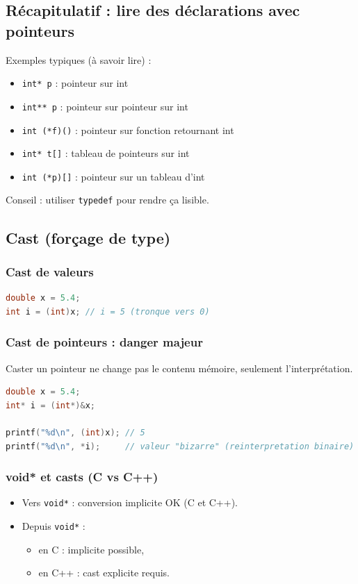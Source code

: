 \subsection{Récapitulatif : lire des déclarations avec pointeurs}
Exemples typiques (à savoir lire) :
\begin{itemize}
  \item \texttt{int* p} : pointeur sur int
  \item \texttt{int** p} : pointeur sur pointeur sur int
  \item \texttt{int (*f)()} : pointeur sur fonction retournant int
  \item \texttt{int* t[]} : tableau de pointeurs sur int
  \item \texttt{int (*p)[]} : pointeur sur un tableau d'int
\end{itemize}
Conseil : utiliser \texttt{typedef} pour rendre ça lisible.

\subsection{Cast (forçage de type)}
\subsubsection{Cast de valeurs}
\begin{lstlisting}[language=C]
double x = 5.4;
int i = (int)x; // i = 5 (tronque vers 0)
\end{lstlisting}

\subsubsection{Cast de pointeurs : danger majeur}
Caster un pointeur ne change pas le contenu mémoire, seulement l'interprétation.
\begin{lstlisting}[language=C]
double x = 5.4;
int* i = (int*)&x;

printf("%d\n", (int)x); // 5
printf("%d\n", *i);     // valeur "bizarre" (reinterpretation binaire)
\end{lstlisting}

\subsubsection{void* et casts (C vs C++)}
\begin{itemize}
  \item Vers \texttt{void*} : conversion implicite OK (C et C++).
  \item Depuis \texttt{void*} :
    \begin{itemize}
      \item en C : implicite possible,
      \item en C++ : cast explicite requis.
    \end{itemize}
\end{itemize}

